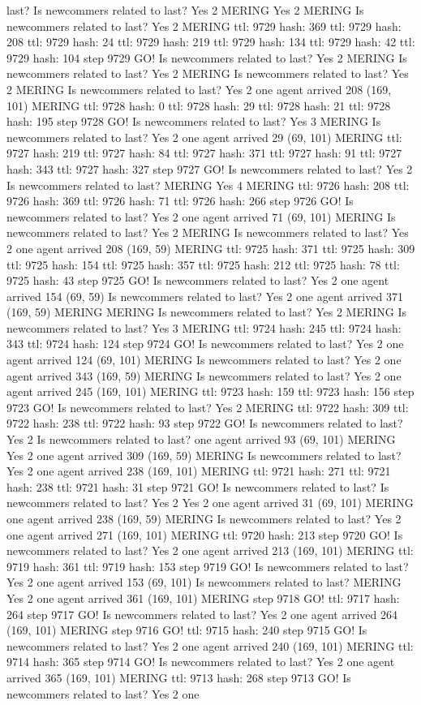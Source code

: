 last? Is newcommers related to last? Yes 2 MERING Yes 2 MERING Is newcommers related to last? Yes 2 MERING ttl: 9729 hash: 369 ttl: 9729 hash: 208 ttl: 9729 hash: 24 ttl: 9729 hash: 219 ttl: 9729 hash: 134 ttl: 9729 hash: 42 ttl: 9729 hash: 104 step 9729 GO! Is newcommers related to last? Yes 2 MERING Is newcommers related to last? Yes 2 MERING Is newcommers related to last? Yes 2 MERING Is newcommers related to last? Yes 2 one agent arrived 208 (169, 101) MERING ttl: 9728 hash: 0 ttl: 9728 hash: 29 ttl: 9728 hash: 21 ttl: 9728 hash: 195 step 9728 GO! Is newcommers related to last? Yes 3 MERING Is newcommers related to last? Yes 2 one agent arrived 29 (69, 101) MERING ttl: 9727 hash: 219 ttl: 9727 hash: 84 ttl: 9727 hash: 371 ttl: 9727 hash: 91 ttl: 9727 hash: 343 ttl: 9727 hash: 327 step 9727 GO! Is newcommers related to last? Yes 2 Is newcommers related to last? MERING Yes 4 MERING ttl: 9726 hash: 208 ttl: 9726 hash: 369 ttl: 9726 hash: 71 ttl: 9726 hash: 266 step 9726 GO! Is newcommers related to last? Yes 2 one agent arrived 71 (69, 101) MERING Is newcommers related to last? Yes 2 MERING Is newcommers related to last? Yes 2 one agent arrived 208 (169, 59) MERING ttl: 9725 hash: 371 ttl: 9725 hash: 309 ttl: 9725 hash: 154 ttl: 9725 hash: 357 ttl: 9725 hash: 212 ttl: 9725 hash: 78 ttl: 9725 hash: 43 step 9725 GO! Is newcommers related to last? Yes 2 one agent arrived 154 (69, 59) Is newcommers related to last? Yes 2 one agent arrived 371 (169, 59) MERING MERING Is newcommers related to last? Yes 2 MERING Is newcommers related to last? Yes 3 MERING ttl: 9724 hash: 245 ttl: 9724 hash: 343 ttl: 9724 hash: 124 step 9724 GO! Is newcommers related to last? Yes 2 one agent arrived 124 (69, 101) MERING Is newcommers related to last? Yes 2 one agent arrived 343 (169, 59) MERING Is newcommers related to last? Yes 2 one agent arrived 245 (169, 101) MERING ttl: 9723 hash: 159 ttl: 9723 hash: 156 step 9723 GO! Is newcommers related to last? Yes 2 MERING ttl: 9722 hash: 309 ttl: 9722 hash: 238 ttl: 9722 hash: 93 step 9722 GO! Is newcommers related to last? Yes 2 Is newcommers related to last? one agent arrived 93 (69, 101) MERING Yes 2 one agent arrived 309 (169, 59) MERING Is newcommers related to last? Yes 2 one agent arrived 238 (169, 101) MERING ttl: 9721 hash: 271 ttl: 9721 hash: 238 ttl: 9721 hash: 31 step 9721 GO! Is newcommers related to last? Is newcommers related to last? Yes 2 Yes 2 one agent arrived 31 (69, 101) MERING one agent arrived 238 (169, 59) MERING Is newcommers related to last? Yes 2 one agent arrived 271 (169, 101) MERING ttl: 9720 hash: 213 step 9720 GO! Is newcommers related to last? Yes 2 one agent arrived 213 (169, 101) MERING ttl: 9719 hash: 361 ttl: 9719 hash: 153 step 9719 GO! Is newcommers related to last? Yes 2 one agent arrived 153 (69, 101) Is newcommers related to last? MERING Yes 2 one agent arrived 361 (169, 101) MERING step 9718 GO! ttl: 9717 hash: 264 step 9717 GO! Is newcommers related to last? Yes 2 one agent arrived 264 (169, 101) MERING step 9716 GO! ttl: 9715 hash: 240 step 9715 GO! Is newcommers related to last? Yes 2 one agent arrived 240 (169, 101) MERING ttl: 9714 hash: 365 step 9714 GO! Is newcommers related to last? Yes 2 one agent arrived 365 (169, 101) MERING ttl: 9713 hash: 268 step 9713 GO! Is newcommers related to last? Yes 2 one 